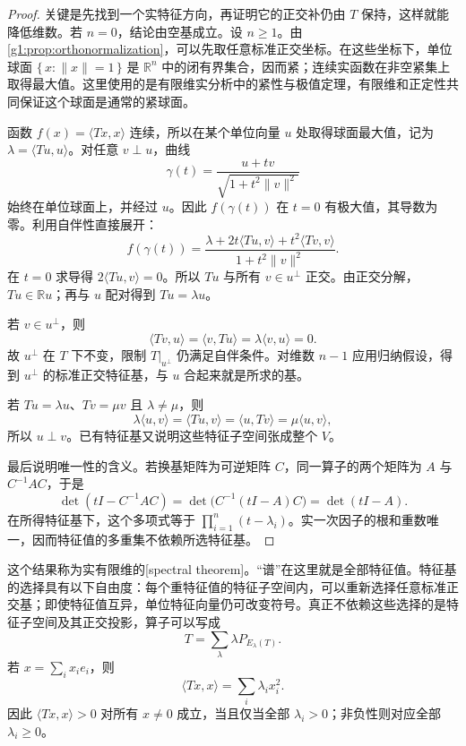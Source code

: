 \begin{proof}
	关键是先找到一个实特征方向，再证明它的正交补仍由 \(T\) 保持，这样就能降低维数。若 \(n=0\)，结论由空基成立。设 \(n\geq1\)。由\cref{g1:prop:orthonormalization}，可以先取任意标准正交坐标。在这些坐标下，单位球面 \(\{\,x:\lVert x\rVert=1\,\}\) 是 \(\mathbb R^n\) 中的闭有界集合，因而紧；连续实函数在非空紧集上取得最大值。这里使用的是有限维实分析中的紧性与极值定理，有限维和正定性共同保证这个球面是通常的紧球面。

	函数 \(f(x)=\langle Tx,x\rangle\) 连续，所以在某个单位向量 \(u\) 处取得球面最大值，记为 \(\lambda=\langle Tu,u\rangle\)。对任意 \(v\perp u\)，曲线
	\[
		\gamma(t)=\frac{u+tv}{\sqrt{1+t^2\lVert v\rVert^2}}
	\]
	始终在单位球面上，并经过 \(u\)。因此 \(f(\gamma(t))\) 在 \(t=0\) 有极大值，其导数为零。利用自伴性直接展开：
	\[
		f(\gamma(t))
		=\frac{\lambda+2t\langle Tu,v\rangle+t^2\langle Tv,v\rangle}
		{1+t^2\lVert v\rVert^2}.
	\]
	在 \(t=0\) 求导得 \(2\langle Tu,v\rangle=0\)。所以 \(Tu\) 与所有 \(v\in u^\perp\) 正交。由正交分解，\(Tu\in\mathbb Ru\)；再与 \(u\) 配对得到 \(Tu=\lambda u\)。

	若 \(v\in u^\perp\)，则
	\[
		\langle Tv,u\rangle=\langle v,Tu\rangle
		=\lambda\langle v,u\rangle=0.
	\]
	故 \(u^\perp\) 在 \(T\) 下不变，限制 \(T|_{u^\perp}\) 仍满足自伴条件。对维数 \(n-1\) 应用归纳假设，得到 \(u^\perp\) 的标准正交特征基，与 \(u\) 合起来就是所求的基。

	若 \(Tu=\lambda u\)、\(Tv=\mu v\) 且 \(\lambda\ne\mu\)，则
	\[
		\lambda\langle u,v\rangle
		=\langle Tu,v\rangle
		=\langle u,Tv\rangle
		=\mu\langle u,v\rangle,
	\]
	所以 \(u\perp v\)。已有特征基又说明这些特征子空间张成整个 \(V\)。

	最后说明唯一性的含义。若换基矩阵为可逆矩阵 \(C\)，同一算子的两个矩阵为 \(A\) 与 \(C^{-1}AC\)，于是
	\[
		\det(tI-C^{-1}AC)=\det\bigl(C^{-1}(tI-A)C\bigr)=\det(tI-A).
	\]
	在所得特征基下，这个多项式等于 \(\prod_{i=1}^n(t-\lambda_i)\)。实一次因子的根和重数唯一，因而特征值的多重集不依赖所选特征基。
\end{proof}

这个结果称为实有限维的[spectral theorem]。“谱”在这里就是全部特征值。特征基的选择具有以下自由度：每个重特征值的特征子空间内，可以重新选择任意标准正交基；即使特征值互异，单位特征向量仍可改变符号。真正不依赖这些选择的是特征子空间及其正交投影，算子可以写成
\[
	T=\sum_{\lambda}\lambda P_{E_\lambda(T)}.
\]
若 \(x=\sum_i x_i e_i\)，则
\[
	\langle Tx,x\rangle=\sum_i\lambda_i x_i^2.
\]
因此 \(\langle Tx,x\rangle>0\) 对所有 \(x\ne0\) 成立，当且仅当全部 \(\lambda_i>0\)；非负性则对应全部 \(\lambda_i\geq0\)。

